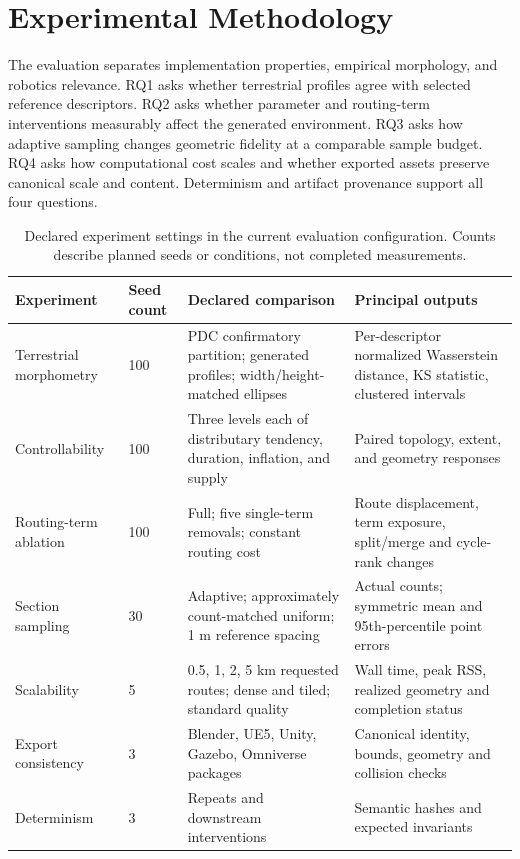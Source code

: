 \documentclass[conference]{IEEEtran}
\begin{document}
\section{Experimental Methodology}
\label{sec:experiments}
The evaluation separates implementation properties, empirical morphology, and robotics relevance. RQ1 asks whether terrestrial profiles agree with selected reference descriptors. RQ2 asks whether parameter and routing-term interventions measurably affect the generated environment. RQ3 asks how adaptive sampling changes geometric fidelity at a comparable sample budget. RQ4 asks how computational cost scales and whether exported assets preserve canonical scale and content. Determinism and artifact provenance support all four questions.

\begin{table}[t]
\caption{Declared experiment settings in the current evaluation configuration. Counts describe planned seeds or conditions, not completed measurements.}
\label{tab:campaign}
\centering\small
\begin{tabularx}{\textwidth}{@{}p{2.65cm}p{2.2cm}YY@{}}
\toprule
Experiment & Seed count & Declared comparison & Principal outputs \\
\midrule
Terrestrial morphometry & 100 & PDC confirmatory partition; generated profiles; width/height-matched ellipses & Per-descriptor normalized Wasserstein distance, KS statistic, clustered intervals \\
Controllability & 100 & Three levels each of distributary tendency, duration, inflation, and supply & Paired topology, extent, and geometry responses \\
Routing-term ablation & 100 & Full; five single-term removals; constant routing cost & Route displacement, term exposure, split/merge and cycle-rank changes \\
Section sampling & 30 & Adaptive; approximately count-matched uniform; 1 m reference spacing & Actual counts; symmetric mean and 95th-percentile point errors \\
Scalability & 5 & 0.5, 1, 2, 5 km requested routes; dense and tiled; standard quality & Wall time, peak RSS, realized geometry and completion status \\
Export consistency & 3 & Blender, UE5, Unity, Gazebo, Omniverse packages & Canonical identity, bounds, geometry and collision checks \\
Determinism & 3 & Repeats and downstream interventions & Semantic hashes and expected invariants \\
\bottomrule
\end{tabularx}
\end{table}
\end{document}
